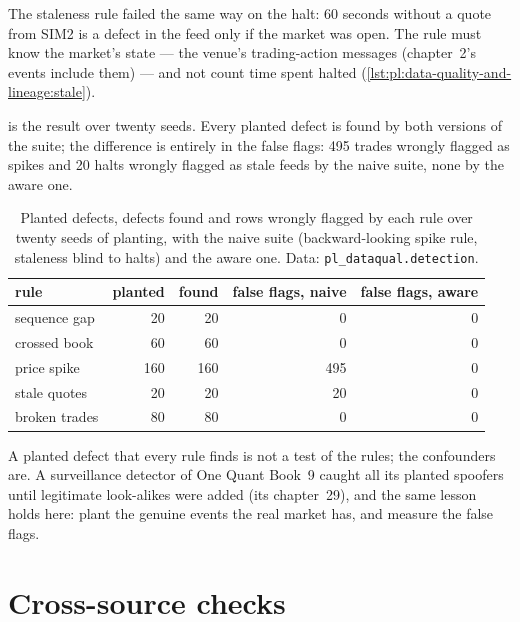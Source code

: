 The staleness rule failed the same way on the halt: 60 seconds without a quote from SIM2 is a defect in the feed only if the market
was open. The rule must know the market's state --- the venue's trading-action messages (chapter~2's events include them) --- and
not count time spent halted (\cref{lst:pl:data-quality-and-lineage:stale}).

\label{lst:pl:data-quality-and-lineage:stale}

 is the result over twenty seeds. Every planted defect is found by both versions of
the suite; the difference is entirely in the false flags: 495 trades wrongly flagged as spikes and 20 halts wrongly flagged as
stale feeds by the naive suite, none by the aware one.

\begin{table}[ht]
\centering\small
\begin{tabular}{lrrrr}
\toprule
rule & planted & found & false flags, naive & false flags, aware \\
\midrule
sequence gap & 20 & 20 & 0 & 0 \\
crossed book & 60 & 60 & 0 & 0 \\
price spike & 160 & 160 & 495 & 0 \\
stale quotes & 20 & 20 & 20 & 0 \\
broken trades & 80 & 80 & 0 & 0 \\
\bottomrule
\end{tabular}
\caption{Planted defects, defects found and rows wrongly flagged by each rule over twenty seeds of planting, with the naive suite
(backward-looking spike rule, staleness blind to halts) and the aware one. Data: \texttt{pl\_dataqual.detection}.}\label{tab:pl:data-quality-and-lineage:detection}
\end{table}

A planted defect that every rule finds is not a test of the rules; the confounders are. A surveillance detector of One Quant
Book~9 caught all its planted spoofers until legitimate look-alikes were added (its chapter~29), and the same lesson holds here:
plant the genuine events the real market has, and measure the false flags.

\section{Cross-source checks}

